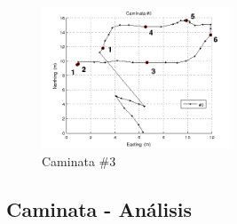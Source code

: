 \documentclass[spanish,12pt,a4paper,titlepage]{report}
\begin{document}
\begin{figure} [h!]
  \centering
  \label{fig:caminatas}
\end{figure}

\begin{figure}
  \begin{center}
\vspace{-60pt}
    \includegraphics[width=0.5\textwidth]{./img/caminata3.png}
  \end{center}
  \caption{Caminata \#3}
  \label{fig:caminata3}
\end{figure}

\subsection{Caminata - Análisis}
\label{sec:caminata-analisis}
\end{document}
